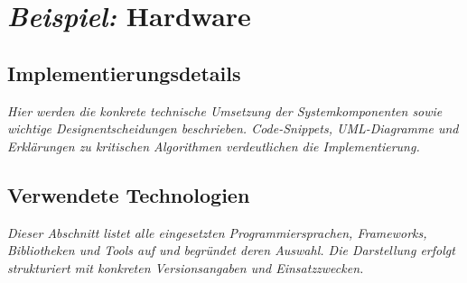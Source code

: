 
\section{\emph{Beispiel:} Hardware\authorA}



\subsection{Implementierungsdetails}

\emph{Hier werden die konkrete technische Umsetzung der Systemkomponenten sowie wichtige Designentscheidungen beschrieben. Code-Snippets, UML-Diagramme und Erklärungen zu kritischen Algorithmen verdeutlichen die Implementierung.}



\subsection{Verwendete Technologien}

\emph{Dieser Abschnitt listet alle eingesetzten Programmiersprachen, Frameworks, Bibliotheken und Tools auf und begründet deren Auswahl. Die Darstellung erfolgt strukturiert mit konkreten Versionsangaben und Einsatzzwecken.}

